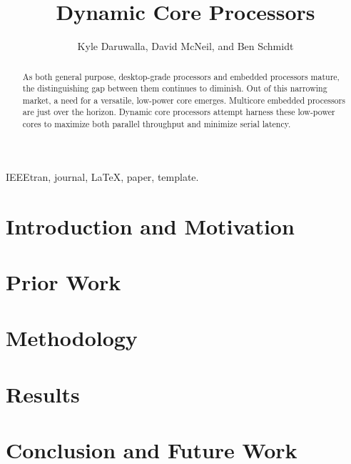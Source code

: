 \documentclass[journal]{IEEEtran}
\begin{document}
\title{Dynamic Core Processors}

\author{Kyle Daruwalla, David McNeil, and Ben Schmidt \\ }%


\maketitle

\begin{abstract}
As both general purpose, desktop-grade processors and embedded processors mature, the distinguishing gap between them continues to diminish. Out of this narrowing market, a need for a versatile, low-power core emerges. Multicore embedded processors are just over the horizon. Dynamic core processors attempt harness these low-power cores to maximize both parallel throughput and minimize serial latency.
\end{abstract}

\begin{IEEEkeywords}
IEEEtran, journal, \LaTeX, paper, template.
\end{IEEEkeywords}


\section{Introduction and Motivation}


\section{Prior Work}


\section{Methodology}


\section{Results}


\section{Conclusion and Future Work}

\end{document}
